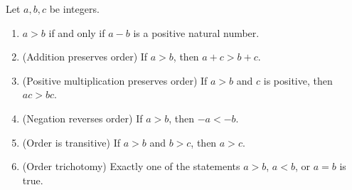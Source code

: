 \begin{lemma}\label{lemma 4.1.4}
Let \(a, b, c\) be integers.
\begin{enumerate}
    \item \(a > b\) if and only if \(a - b\) is a positive natural number.
    \item (Addition preserves order) If \(a > b\), then \(a + c > b + c\).
    \item (Positive multiplication preserves order) If \(a > b\) and \(c\) is positive, then \(ac > bc\).
    \item (Negation reverses order) If \(a > b\), then \(-a < -b\).
    \item (Order is transitive) If \(a > b\) and \(b > c\), then \(a > c\).
    \item (Order trichotomy) Exactly one of the statements \(a > b\), \(a < b\), or \(a = b\) is true.
\end{enumerate}
\end{lemma}